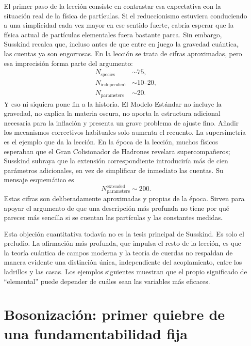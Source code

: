 El primer paso de la lección consiste en contrastar esa expectativa con la situación real de la física de partículas. Si el reduccionismo estuviera conduciendo a una simplicidad cada vez mayor en ese sentido fuerte, cabría esperar que la física actual de partículas elementales fuera bastante parca. Sin embargo, Susskind recalca que, incluso antes de que entre en juego la gravedad cuántica, las cuentas ya son engorrosas. En la lección se trata de cifras aproximadas, pero esa imprecisión forma parte del argumento:
\begin{equation}
\begin{aligned}
N_{\mathrm{species}}&\sim 75,\\
N_{\mathrm{independent}}&\sim 10\text{--}20,\\
N_{\mathrm{parameters}}&\sim 20.
\end{aligned}
\end{equation}
Y eso ni siquiera pone fin a la historia. El Modelo Estándar no incluye la gravedad, no explica la materia oscura, no aporta la estructura adicional necesaria para la inflación y presenta un grave problema de ajuste fino. Añadir los mecanismos correctivos habituales solo aumenta el recuento. La supersimetría es el ejemplo que da la lección. En la época de la lección, muchos físicos esperaban que el Gran Colisionador de Hadrones revelara supercompañeros; Susskind subraya que la extensión correspondiente introduciría más de cien parámetros adicionales, en vez de simplificar de inmediato las cuentas. Su mensaje esquemático es
\begin{equation}
N_{\mathrm{parameters}}^{\mathrm{extended}} \sim 200.
\end{equation}
Estas cifras son deliberadamente aproximadas y propias de la época. Sirven para apoyar el argumento de que una descripción más profunda no tiene por qué parecer más sencilla si se cuentan las partículas y las constantes medidas.

Esta objeción cuantitativa todavía no es la tesis principal de Susskind. Es solo el preludio. La afirmación más profunda, que impulsa el resto de la lección, es que la teoría cuántica de campos moderna y la teoría de cuerdas no respaldan de manera evidente una distinción única, independiente del acoplamiento, entre los ladrillos y las casas. Los ejemplos siguientes muestran que el propio significado de ``elemental'' puede depender de cuáles sean las variables más eficaces.

\section{Bosonización: primer quiebre de una fundamentabilidad fija}

